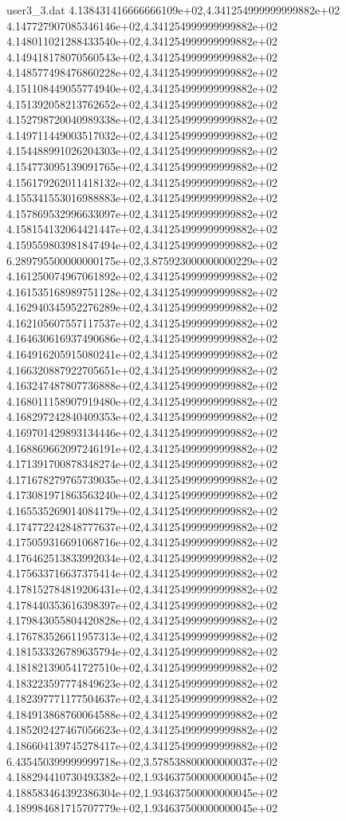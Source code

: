 \begin{filecontents}{user3_3.dat}
4.138431416666666109e+02,4.341254999999999882e+02
4.147727907085346146e+02,4.341254999999999882e+02
4.148011021288433540e+02,4.341254999999999882e+02
4.149418178070560543e+02,4.341254999999999882e+02
4.148577498476860228e+02,4.341254999999999882e+02
4.151108449055774940e+02,4.341254999999999882e+02
4.151392058213762652e+02,4.341254999999999882e+02
4.152798720040989338e+02,4.341254999999999882e+02
4.149711449003517032e+02,4.341254999999999882e+02
4.154488991026204303e+02,4.341254999999999882e+02
4.154773095139091765e+02,4.341254999999999882e+02
4.156179262011418132e+02,4.341254999999999882e+02
4.155341553016988883e+02,4.341254999999999882e+02
4.157869532996633097e+02,4.341254999999999882e+02
4.158154132064421447e+02,4.341254999999999882e+02
4.159559803981847494e+02,4.341254999999999882e+02
6.289795500000000175e+02,3.875923000000000229e+02
4.161250074967061892e+02,4.341254999999999882e+02
4.161535168989751128e+02,4.341254999999999882e+02
4.162940345952276289e+02,4.341254999999999882e+02
4.162105607557117537e+02,4.341254999999999882e+02
4.164630616937490686e+02,4.341254999999999882e+02
4.164916205915080241e+02,4.341254999999999882e+02
4.166320887922705651e+02,4.341254999999999882e+02
4.163247487807736888e+02,4.341254999999999882e+02
4.168011158907919480e+02,4.341254999999999882e+02
4.168297242840409353e+02,4.341254999999999882e+02
4.169701429893134446e+02,4.341254999999999882e+02
4.168869662097246191e+02,4.341254999999999882e+02
4.171391700878348274e+02,4.341254999999999882e+02
4.171678279765739035e+02,4.341254999999999882e+02
4.173081971863563240e+02,4.341254999999999882e+02
4.165535269014084179e+02,4.341254999999999882e+02
4.174772242848777637e+02,4.341254999999999882e+02
4.175059316691068716e+02,4.341254999999999882e+02
4.176462513833992034e+02,4.341254999999999882e+02
4.175633716637375414e+02,4.341254999999999882e+02
4.178152784819206431e+02,4.341254999999999882e+02
4.178440353616398397e+02,4.341254999999999882e+02
4.179843055804420828e+02,4.341254999999999882e+02
4.176783526611957313e+02,4.341254999999999882e+02
4.181533326789635794e+02,4.341254999999999882e+02
4.181821390541727510e+02,4.341254999999999882e+02
4.183223597774849623e+02,4.341254999999999882e+02
4.182397771177504637e+02,4.341254999999999882e+02
4.184913868760064588e+02,4.341254999999999882e+02
4.185202427467056623e+02,4.341254999999999882e+02
4.186604139745278417e+02,4.341254999999999882e+02
6.435450399999999718e+02,3.578538800000000037e+02
4.188294410730493382e+02,1.934637500000000045e+02
4.188583464392386304e+02,1.934637500000000045e+02
4.189984681715707779e+02,1.934637500000000045e+02

\end{filecontents}
